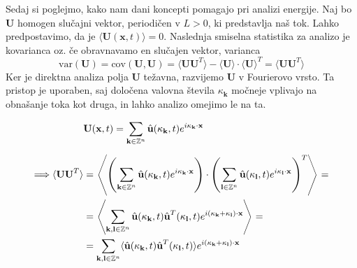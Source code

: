 \documentclass[mat2, tisk]{fmfdelo}
\newcommand{\Z}{\mathbb Z}
\newcommand{\bd}{\textbf}
\begin{document}
Sedaj si poglejmo, kako nam dani koncepti pomagajo pri analizi 
energije. Naj bo $\bd{U}$  homogen slučajni vektor, periodičen v $L>0$, ki predstavlja naš tok. 
Lahko predpostavimo, da je $\langle \bd{U}(\bd{x}, t) \rangle = 0$. Naslednja 
smiselna statistika za analizo je kovarianca oz. če obravnavamo en 
slučajen vektor, varianca 
$$
\text{var}(\bd{U}) = \text{cov}(\bd{U}, \bd{U}) = \langle \bd{U} \bd{U}^T \rangle - \langle \bd{U} \rangle \cdot \langle \bd{U} \rangle^T = \langle \bd{U} \bd{U}^T \rangle
$$
Ker je direktna analiza polja \bd{U} težavna, razvijemo \bd{U}
v Fourierovo vrsto. Ta pristop je uporaben, saj določena valovna 
števila $\bd{$\kappa$}_\bd{k}$ močneje vplivajo na obnašanje toka kot 
druga, in lahko analizo omejimo le na ta. 

\begin{align*}
&\bd{U}(\bd{x}, t) = \sum_{\bd{k}\in \Z^{n}} \hat{\bd{u}}(\bd{\text{$\kappa$}}_\bd{k}, t) e^{i\bd{\text{$\kappa$}}_\bd{k} \cdot \bd{x}}\\[2mm]
\Longrightarrow \langle \bd{U} \bd{U}^T\rangle &= \left\langle \left(\sum_{\bd{k}\in \Z^{n}} \hat{\bd{u}}(\bd{\text{$\kappa$}}_\bd{k}, t) e^{i\bd{\text{$\kappa$}}_\bd{k} \cdot \bd{x}}\right) \cdot \left(\sum_{\bd{l}\in \Z^{n}} \hat{\bd{u}}(\bd{\text{$\kappa$}}_\bd{l}, t) e^{i\bd{\text{$\kappa$}}_\bd{l} \cdot \bd{x}}\right)^T \right\rangle = \\
&= \left\langle \sum_{\bd{k}, \bd{l}\in \Z^{n}} \hat{\bd{u}}(\bd{\text{$\kappa$}}_\bd{k}, t) \hat{\bd{u}}^T(\bd{\text{$\kappa$}}_\bd{l}, t) e^{i(\bd{\text{$\kappa$}}_\bd{k} + \bd{\text{$\kappa$}}_\bd{l})\cdot \bd{x}} \right\rangle = \\
&=  \sum_{\bd{k}, \bd{l}\in \Z^{n}} \langle \hat{\bd{u}}(\bd{\text{$\kappa$}}_\bd{k}, t) \hat{\bd{u}}^T(\bd{\text{$\kappa$}}_\bd{l}, t) \rangle e^{i(\bd{\text{$\kappa$}}_\bd{k} + \bd{\text{$\kappa$}}_\bd{l})\cdot \bd{x}} 
\end{align*}
\end{document}
